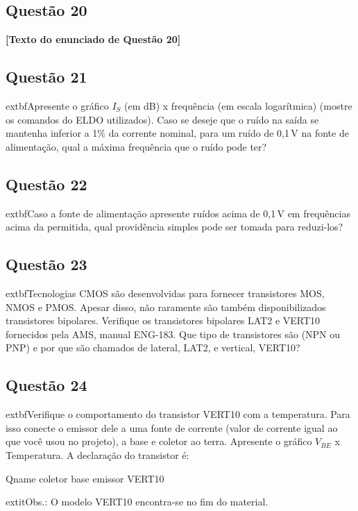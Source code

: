 ﻿\documentclass[12pt,a4paper]{article}
\begin{document}

\subsection*{Questão 20}
\begin{BoxQ}
    \textbf{[Texto do enunciado de Questão 20]}
\end{BoxQ}

\subsection*{Questão 21}
\begin{BoxQ}
	extbf{Apresente o gráfico $I_{S}$ (em dB) x frequência (em escala logarítmica) (mostre os comandos do ELDO utilizados). Caso se deseje que o ruído na saída se mantenha inferior a 1\% da corrente nominal, para um ruído de 0,1\,V na fonte de alimentação, qual a máxima frequência que o ruído pode ter?}
\end{BoxQ}

\subsection*{Questão 22}
\begin{BoxQ}
	extbf{Caso a fonte de alimentação apresente ruídos acima de 0,1\,V em frequências acima da permitida, qual providência simples pode ser tomada para reduzi-los?}
\end{BoxQ}

\subsection*{Questão 23}
\begin{BoxQ}
	extbf{Tecnologias CMOS são desenvolvidas para fornecer transistores MOS, NMOS e PMOS. Apesar disso, não raramente são também disponibilizados transistores bipolares. Verifique os transistores bipolares LAT2 e VERT10 fornecidos pela AMS, manual ENG-183. Que tipo de transistores são (NPN ou PNP) e por que são chamados de lateral, LAT2, e vertical, VERT10?}
\end{BoxQ}

\subsection*{Questão 24}
\begin{BoxQ}
	extbf{Verifique o comportamento do transistor VERT10 com a temperatura. Para isso conecte o emissor dele a uma fonte de corrente (valor de corrente igual ao que você usou no projeto), a base e coletor ao terra. Apresente o gráfico $V_{BE}$ x Temperatura. A declaração do transistor é:}
\begin{codeblock}[title={Declaração do transistor VERT10}]
Qname coletor base emissor VERT10
\end{codeblock}
    	extit{Obs.:} O modelo VERT10 encontra-se no fim do material.
\end{BoxQ}
\end{document}
